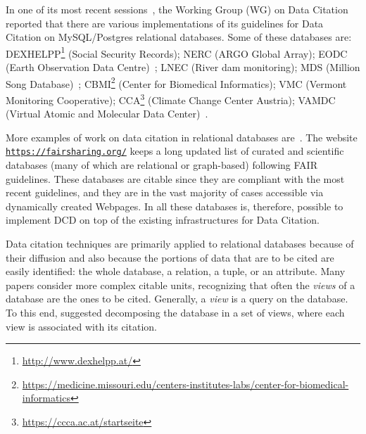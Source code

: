 In one of its most recent sessions~\citep{rauber2015data}, the Working Group (WG) on Data Citation reported that there are various implementations of its guidelines for Data Citation on MySQL/Postgres relational databases. 
Some of these databases are: DEXHELPP\footnote{\url{http://www.dexhelpp.at/}} (Social Security Records); NERC (ARGO Global Array); EODC (Earth Observation Data Centre)~\citep{gosswein2019data}; LNEC (River dam monitoring); MDS (Million Song Database)~\citep{bertin2011million}; CBMI\footnote{\url{https://medicine.missouri.edu/centers-institutes-labs/center-for-biomedical-informatics}} (Center for Biomedical Informatics); VMC (Vermont Monitoring Cooperative); CCA\footnote{\url{https://ccca.ac.at/startseite}} (Climate Change Center Austria); VAMDC (Virtual Atomic and Molecular Data Center)~\citep{Dubernet_2016, ZwolfEtAl2016}.

More examples of work on data citation in relational databases are~\citep{bunemann2016citation, WuSIGMOD18, AlawiniDHW17,davidson2017model, buneman2010rule}. 
The website \texttt{\url{https://fairsharing.org/}} keeps a long updated list of curated and scientific databases (many of which are relational or graph-based) following FAIR guidelines. These databases are citable since they are compliant with the most recent guidelines, and they are in the vast majority of cases accessible via dynamically created Webpages. 
In all these databases is, therefore, possible to implement DCD on top of the existing infrastructures for Data Citation.

Data citation techniques are primarily applied to relational databases because of their diffusion and also because the portions of data that are to be cited are easily identified: the whole database, a relation, a tuple, or an attribute. 
Many papers \citep{buneman2006cite, bunemann2016citation, AlawiniDHW17} consider more complex citable units, recognizing that often the \emph{views} of a database are the ones to be cited. Generally, a \emph{view} is a query on the database.
To this end, \citep{WuSIGMOD18} suggested decomposing the database in a set of views, where each view is associated with its citation. 


